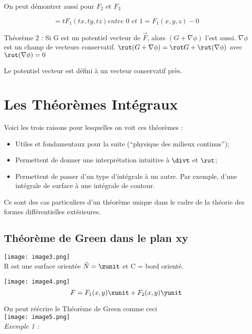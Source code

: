 On peut démontrer aussi pour $F_2 $ et $F_3$

\[ = tF_1 ( tx,ty,tz) \textit{entre 0 et 1} = F_1 (x,y,z) - 0\]

\begin{myrem}

Théorème 2 : Si G est un potentiel vecteur de $\vec F$, alors $(G+\nabla \phi )$ l'est aussi. $\nabla \phi$ est un champ de vecteurs conservatif.
$\rot ( G+\nabla \phi )  = \rot G + \rot ( \nabla  \phi )$ avec $\rot ( \nabla  \phi )=0$
\end{myrem}


Le potentiel vecteur est défini à un vecteur conservatif près.

\section{Les Théorèmes Intégraux}


Voici les trois raisons pour lesquelles on voit ces théorèmes :
\begin{itemize}
\item Utiles et fondamentaux pour la suite (``physique des milieux continus'');
\item Permettent de donner une interprétation intuitive à $\divt$ et $\rot$;
\item Permettent de passer d'un type d'intégrale à un autre. Par exemple, d'une intégrale de surface à une intégrale de contour.
\end{itemize}

Ce sont des cas particuliers d'un théorème unique dans le cadre de la théorie des formes différentielles extérieures.

\subsection{Théorème de Green dans le plan xy}

\texttt{[image: image3.png]}
\\
R est une surface orientée $ \hat N = \zunit$ et C = bord orienté.

\texttt{[image: image4.png]}\\

\[F=F_1(x,y)\xunit +F_2(x,y)\yunit\]

On peut réécrire le Théorème de Green comme ceci\\
\texttt{[image: image5.png]}\\
\textit{
Exemple 1 : }

